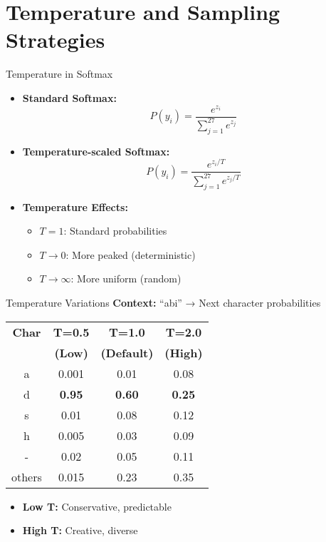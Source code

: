 \documentclass[usenames,dvipsnames]{beamer}
\begin{document}
\section{Temperature and Sampling Strategies}

\begin{frame}{Temperature in Softmax}
\begin{itemize}[<+->]
\item \textbf{Standard Softmax:}
\begin{equation}
P(y_i) = \frac{e^{z_i}}{\sum_{j=1}^{27} e^{z_j}}
\end{equation}

\item \textbf{Temperature-scaled Softmax:}
\begin{equation}
P(y_i) = \frac{e^{z_i/T}}{\sum_{j=1}^{27} e^{z_j/T}}
\end{equation}

\item \textbf{Temperature Effects:}
\begin{itemize}
\item $T = 1$: Standard probabilities
\item $T \to 0$: More peaked (deterministic)
\item $T \to \infty$: More uniform (random)
\end{itemize}
\end{itemize}
\end{frame}

\begin{frame}{Temperature Variations}
\textbf{Context:} ``abi'' → Next character probabilities

\vspace{0.3cm}
\begin{center}
\begin{tabular}{|c|c|c|c|}
\hline
\textbf{Char} & \textbf{T=0.5} & \textbf{T=1.0} & \textbf{T=2.0} \\
 & \textbf{(Low)} & \textbf{(Default)} & \textbf{(High)} \\
\hline
a & 0.001 & 0.01 & 0.08 \\
d & \textbf{0.95} & \textbf{0.60} & \textbf{0.25} \\
s & 0.01 & 0.08 & 0.12 \\
h & 0.005 & 0.03 & 0.09 \\
- & 0.02 & 0.05 & 0.11 \\
others & 0.015 & 0.23 & 0.35 \\
\hline
\end{tabular}
\end{center}

\vspace{0.3cm}
\begin{itemize}
\item \textbf{Low T:} Conservative, predictable
\item \textbf{High T:} Creative, diverse
\end{itemize}
\end{frame}
\end{document}
